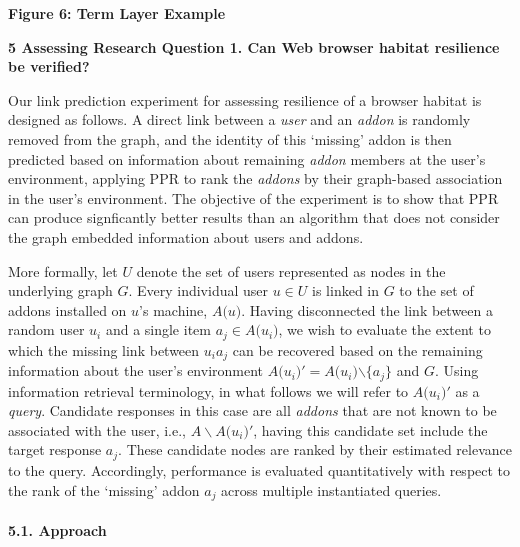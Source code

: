 \documentclass{article} %
\begin{document}
\textbf{}

\noindent \textbf{Figure 6: Term Layer Example} 



\noindent   



\noindent \textbf{5  Assessing Research Question 1. Can Web browser habitat resilience be verified?}



Our link prediction experiment for assessing resilience of a browser habitat is designed as follows. A direct link between a \textit{user} and an\textit{ addon} is randomly removed from the graph, and the identity of this `missing' addon is then predicted based on information about remaining \textit{addon} members at the user's environment, applying PPR to rank the \textit{addons} by their graph-based association in the user's environment. The objective of the experiment is to show that PPR can produce signficantly better results than an algorithm that does not consider the graph embedded information about users and addons. 

More formally, let $U$ denote the set of users represented as nodes in the underlying graph $G$. Every individual user $u\mathrm{\in }U$ is linked in $G$ to the set of addons installed on $u$'s machine, $A\mathrm{(}u\mathrm{)}$. Having disconnected the link between a random user $u_i$ and a single item $a_j\mathrm{\in }A\mathrm{(}u_i\mathrm{)}$, we wish to evaluate the extent to which the missing link between $u_ia_j$ can be recovered based on the remaining information about the user's environment $A\mathrm{(}u_i\mathrm{)'=}A\mathrm{(}u_i\mathrm{)}\mathrm{\backslash }\mathrm{\{}a_j\}$ and $G$. Using information retrieval terminology, in what follows we will refer to $A\mathrm{(}u_i\mathrm{)'}$ as a \textit{query}. Candidate responses in this case are all\textit{ addons} that are not known to be associated with the user, i.e., $A\backslash A\mathrm{(}u_i\mathrm{)'}$, having this candidate set include the target response $a_j$. These candidate nodes are ranked by their estimated relevance to the query. Accordingly, performance is evaluated quantitatively with respect to the rank of the `missing'\textit{ }addon $a_j$ across multiple instantiated queries.




\paragraph{5.1.  Approach}
\end{document}
